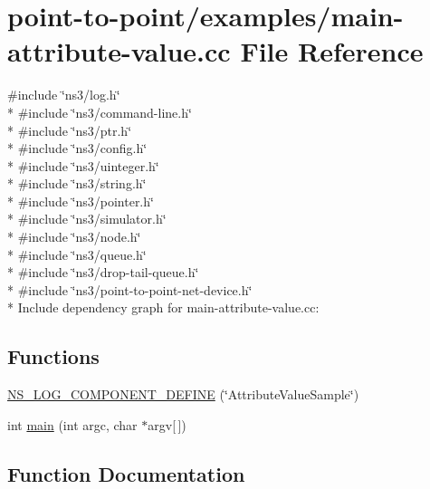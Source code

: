 \hypertarget{main-attribute-value_8cc}{}\section{point-\/to-\/point/examples/main-\/attribute-\/value.cc File Reference}
\label{main-attribute-value_8cc}
{\ttfamily \#include \char`\"{}ns3/log.\+h\char`\"{}}\\*
{\ttfamily \#include \char`\"{}ns3/command-\/line.\+h\char`\"{}}\\*
{\ttfamily \#include \char`\"{}ns3/ptr.\+h\char`\"{}}\\*
{\ttfamily \#include \char`\"{}ns3/config.\+h\char`\"{}}\\*
{\ttfamily \#include \char`\"{}ns3/uinteger.\+h\char`\"{}}\\*
{\ttfamily \#include \char`\"{}ns3/string.\+h\char`\"{}}\\*
{\ttfamily \#include \char`\"{}ns3/pointer.\+h\char`\"{}}\\*
{\ttfamily \#include \char`\"{}ns3/simulator.\+h\char`\"{}}\\*
{\ttfamily \#include \char`\"{}ns3/node.\+h\char`\"{}}\\*
{\ttfamily \#include \char`\"{}ns3/queue.\+h\char`\"{}}\\*
{\ttfamily \#include \char`\"{}ns3/drop-\/tail-\/queue.\+h\char`\"{}}\\*
{\ttfamily \#include \char`\"{}ns3/point-\/to-\/point-\/net-\/device.\+h\char`\"{}}\\*
Include dependency graph for main-\/attribute-\/value.cc\+:
\subsection*{Functions}
\begin{DoxyCompactItemize}
\item 
\hyperlink{main-attribute-value_8cc_aa270904e4c35a164a833f94b3817d64d}{N\+S\+\_\+\+L\+O\+G\+\_\+\+C\+O\+M\+P\+O\+N\+E\+N\+T\+\_\+\+D\+E\+F\+I\+NE} (\char`\"{}Attribute\+Value\+Sample\char`\"{})
\item 
int \hyperlink{main-attribute-value_8cc_a0ddf1224851353fc92bfbff6f499fa97}{main} (int argc, char $\ast$argv\mbox{[}$\,$\mbox{]})
\end{DoxyCompactItemize}


\subsection{Function Documentation}
